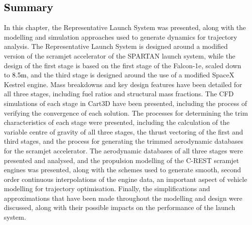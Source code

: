 \textcolor{black}{
	\section{Summary}	
}
	
	\noindent
	In this chapter, the Representative Launch System was presented, along with the modelling and simulation approaches used to generate dynamics for trajectory analysis. 
	The Representative Launch System is designed around a modified version of the scramjet accelerator of the SPARTAN launch system, while the design of the first stage is based on the first stage of the Falcon-1e, scaled down to \textcolor{black}{8.5m}, and the third stage is designed around the use of a modified SpaceX Kestrel engine. 
	 Mass breakdowns and key design features have been detailed for all three stages, including fuel ratios and structural mass fractions.
	 The CFD simulations of each stage in Cart3D have been presented, including the process of verifying the convergence of each solution. 
	 The processes for determining the trim characteristics of each stage were presented, including the calculation of the variable centre of gravity of all three stages, the thrust vectoring of the first and third stages, and the process for generating the trimmed aerodynamic databases for the scramjet accelerator.
	 The aerodynamic databases of all three stages were presented and analysed, and the propulsion modelling of the C-REST scramjet engines was presented, along with the schemes used to generate smooth, second order continuous interpolations of the engine data, an important aspect of vehicle modelling for trajectory optimisation. 
	 Finally, the simplifications and approximations that have been made throughout the modelling and design were discussed, along with their possible impacts on the performance of the launch system.
	
	